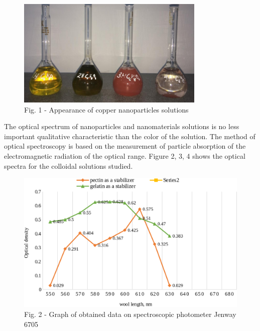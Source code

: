 \begin{figure}[H]
	\centering
	\includegraphics[width=0.8\textwidth]{assets/14}
	\caption*{Fig. 1 - Appearance of copper nanoparticles solutions}
\end{figure}

\begin{multicols}{2}
The optical spectrum of nanoparticles and nanomaterials solutions is no
less important qualitative characteristic than the color of the
solution. The method of optical spectroscopy is based on the measurement
of particle absorption of the electromagnetic radiation of the optical
range. Figure 2, 3, 4 shows the optical spectra for the colloidal
solutions studied.
\end{multicols}

\begin{figure}[H]
	\centering
	\includegraphics[width=\textwidth]{assets/14.1}
	\caption*{Fig. 2 - Graph of obtained data on spectroscopic photometer Jenway 6705}
\end{figure}

